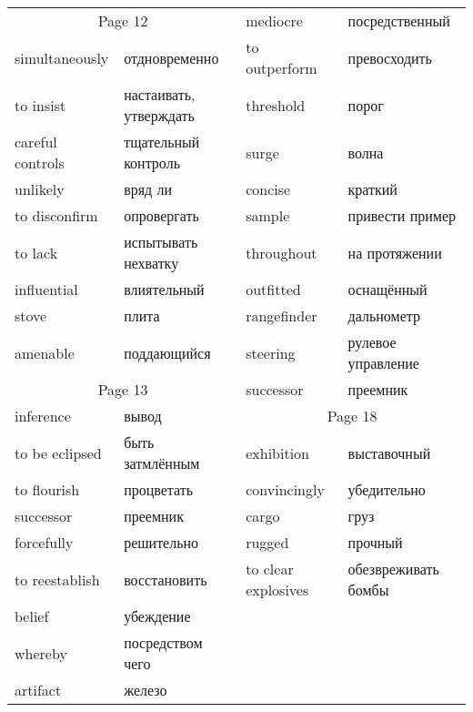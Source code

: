 \documentclass[12pt]{article}
\begin{document}
\begin{tabular}{| l l | l l | }
  \multicolumn{2}{c|}{Page 12} & mediocre & посредственный \\
  simultaneously & отдновременно & to outperform & превосходить \\
  to insist & настаивать, утверждать & threshold & порог \\
  careful controls & тщательный контроль& surge & волна \\
  unlikely & вряд ли & concise & краткий \\
  to disconfirm & опровергать & sample & привести пример \\
  to lack & испытывать нехватку & throughout & на протяжении \\
  influential & влиятельный & outfitted & оснащённый \\
  stove & плита & rangefinder & дальнометр \\
  amenable & поддающийся & steering & рулевое управление \\ \cline{1-2}
  
  \multicolumn{2}{c|}{Page 13} &  successor & преемник \\ \cline{3-4}
  inference & вывод & \multicolumn{2}{c|}{Page 18} \\
  to be eclipsed & быть затмлённым & exhibition & выставочный \\
  to flourish & процветать & convincingly & убедительно \\
  successor & преемник & cargo & груз \\
  forcefully & решительно & rugged & прочный \\
  to reestablish & восстановить & to clear explosives & обезвреживать бомбы \\
  belief & убеждение\\
  whereby & посредством чего \\
  artifact & железо \\
  
  
  \hline

\end{tabular}
\end{document}
